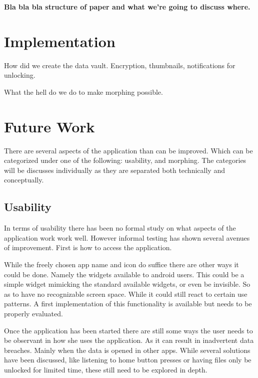 \documentclass[twocolumn,english,compsoc,journal]{IEEEtran}
\begin{document}
\textbf{Bla bla bla structure of paper and what we're going to discuss
where.}






\section{Implementation}

How did we create the data vault. Encryption, thumbnails, notifications
for unlocking.

What the hell do we do to make morphing possible.



\section{Future Work}

There are several aspects of the application than can be improved. Which
can be categorized under one of the following: usability, and morphing.
The categories will be discusses individually as they are separated both
technically and conceptually. 

\subsection{Usability}

In terms of usability there has been no formal study on what aspects of
the application work work well. However informal testing has shown several
avenues of improvement. First is how to access the application. 

While the freely chosen app name and icon do suffice there are other ways 
it could be done. Namely the widgets available to android users. This could 
be a simple widget mimicking the standard available widgets, or even be 
invisible. So as to have no recognizable screen space. While it could still
react to certain use patterns. A first implementation of this functionality is
available but needs to be properly evaluated.

Once the application has been started there are still some ways the user
needs to be observant in how she uses the application. As it can result in
inadvertent data breaches. Mainly when the data is opened in other apps.
While several solutions have been discussed, like listening to home button
presses or having files only be unlocked for limited time, these still need
to be explored in depth.
\end{document}
